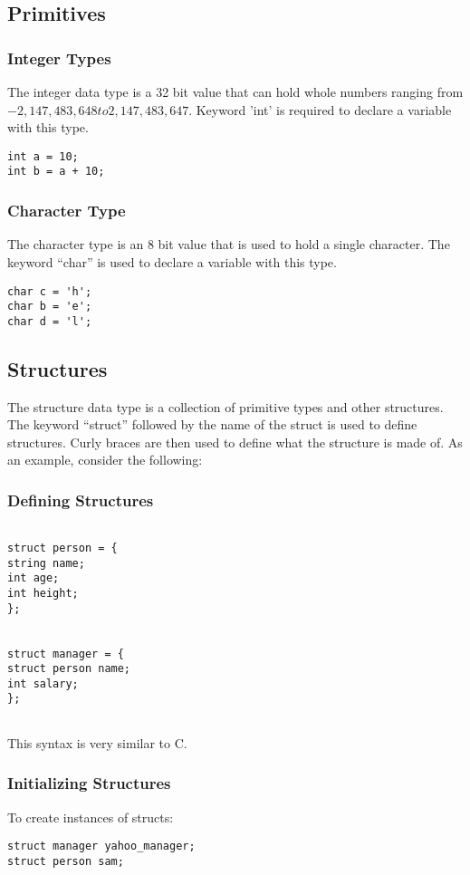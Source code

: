 \documentclass{article}
\begin{document}
\subsection{Primitives}
\subsubsection{Integer Types}
The integer data type is a 32 bit value that can hold whole numbers ranging from $-2,147,483,648 to 2,147,483,647$. Keyword 'int' is required to declare a variable with this type. 
\begin{lstlisting}
int a = 10;
int b = a + 10;
\end{lstlisting}

\subsubsection{Character Type}
The character type is an 8 bit value that is used to hold a single character. The keyword ``char'' is used to declare a variable with this type. 
\begin{lstlisting}
char c = 'h';
char b = 'e';
char d = 'l';
\end{lstlisting}

\subsection{Structures}
The structure data type is a collection of primitive types and other structures. The keyword ``struct'' followed by the name of the struct is used to define structures. Curly braces are then used to define what the structure is made of. As an example, consider the following:

\subsubsection{Defining Structures}

\begin{lstlisting}

struct person = {
string name;
int age;
int height;
};


struct manager = {
struct person name;
int salary;
};


\end{lstlisting}
This syntax is very similar to C.

\subsubsection{Initializing Structures}
To create instances of structs: 
\begin{lstlisting}
struct manager yahoo_manager;
struct person sam;
\end{lstlisting}
\end{document}
